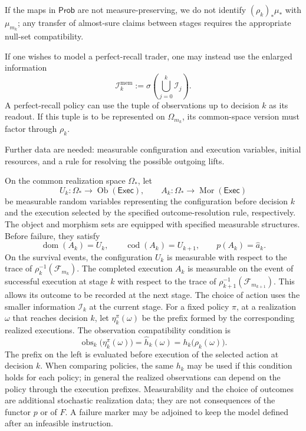 \documentclass[11pt,a4paper]{article}
\newcommand{\Prob}{\mathsf{Prob}}
\begin{document}
If the maps in $\Prob$ are not measure-preserving, we do not identify
$(\rho_k)_*\mu_*$ with $\mu_{m_k}$; any transfer of almost-sure claims
between stages requires the appropriate null-set compatibility.

If one wishes to model a perfect-recall trader, one may instead use the
enlarged information
\[
  \mathcal I_k^{\mathrm{mem}}
  :=\sigma\!\left(\bigcup_{j=0}^k\mathcal I_j\right).
\]
A perfect-recall policy can use the tuple of observations up to decision
$k$ as its readout. If this tuple is to be represented on
$\Omega_{m_k}$, its common-space version must factor through $\rho_k$.

Further data are needed: measurable configuration and execution variables,
initial resources, and a rule for resolving the possible outgoing lifts.

On the common realization space $\Omega_*$, let
\[
  U_k:\Omega_*\to\operatorname{Ob}(\mathsf{Exec}),
  \qquad
  A_k:\Omega_*\to\operatorname{Mor}(\mathsf{Exec})
\]
be measurable random variables representing the configuration
before decision $k$ and the execution selected by the specified
outcome-resolution rule, respectively. The object and morphism
sets are equipped with specified measurable structures.
Before failure, they satisfy
\[
  \operatorname{dom}(A_k)=U_k,\qquad
  \operatorname{cod}(A_k)=U_{k+1},\qquad
  p(A_k)=\widehat a_k.
\]
On the survival events, the configuration $U_k$ is measurable with
respect to the trace of $\rho_k^{-1}(\mathcal F_{m_k})$. The completed
execution $A_k$ is measurable on the event of successful execution at
stage $k$ with respect to the trace of
$\rho_{k+1}^{-1}(\mathcal F_{m_{k+1}})$. This allows its outcome to be
recorded at the next stage. The choice of action uses the smaller
information $\mathcal I_k$ at the current stage.
For a fixed policy $\pi$, at a realization $\omega$ that reaches decision
$k$, let $\eta_k^\pi(\omega)$ be the prefix formed by the corresponding
realized executions. The observation compatibility condition is
\begin{equation}
  \operatorname{obs}_k\bigl(\eta_k^\pi(\omega)\bigr)
   =\widehat h_k(\omega)=h_k\bigl(\rho_k(\omega)\bigr).
  \label{eq:observation-compatibility}
\end{equation}
The prefix on the left is evaluated before execution of the selected
action at decision $k$. When comparing policies, the same $h_k$ may be
used if this condition holds for each policy; in general the realized
observations can depend on the policy through the execution prefixes.
Measurability and the choice of outcomes are additional stochastic
realization data; they are not consequences of the functor $p$ or of $F$.
A failure marker may be adjoined to keep the model defined after an
infeasible instruction.
\end{document}
